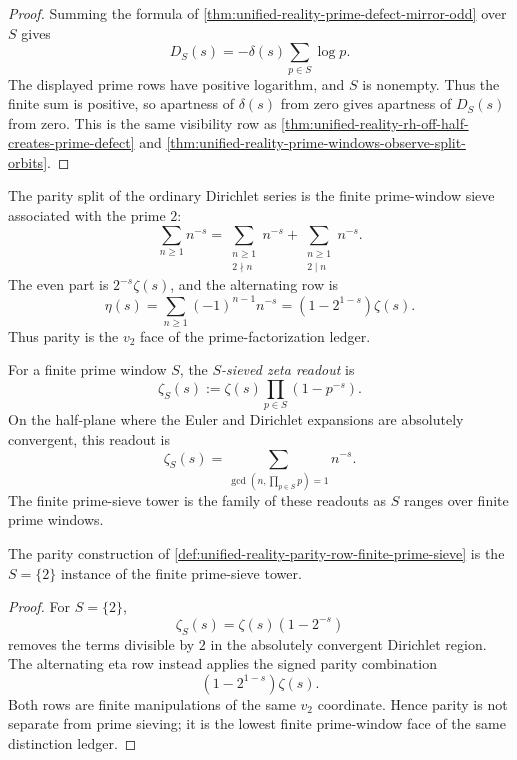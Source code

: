 \begin{proof}
Summing the formula of
\autoref{thm:unified-reality-prime-defect-mirror-odd} over $S$ gives
$$
D_S(s)
=
-\delta(s)\sum_{p\in S}\log p.
$$
The displayed prime rows have positive logarithm, and $S$ is nonempty.
Thus the finite sum is positive, so apartness of $\delta(s)$ from zero
gives apartness of $D_S(s)$ from zero.  This is the same visibility row
as \autoref{thm:unified-reality-rh-off-half-creates-prime-defect} and
\autoref{thm:unified-reality-prime-windows-observe-split-orbits}.
\end{proof}

\begin{definition}
\label{def:unified-reality-parity-row-finite-prime-sieve}
The parity split of the ordinary Dirichlet series is the finite
prime-window sieve associated with the prime $2$:
$$
\sum_{n\ge 1} n^{-s}
=
\sum_{\substack{n\ge 1\\2\nmid n}} n^{-s}
+
\sum_{\substack{n\ge 1\\2\mid n}} n^{-s}.
$$
The even part is $2^{-s}\zeta(s)$, and the alternating row is
$$
\eta(s)
=
\sum_{n\ge 1}(-1)^{n-1}n^{-s}
=
(1-2^{1-s})\zeta(s).
$$
Thus parity is the $v_2$ face of the prime-factorization ledger.
\end{definition}

\begin{definition}
\label{def:unified-reality-finite-prime-sieve-tower}
For a finite prime window $S$, the \emph{$S$-sieved zeta readout} is
$$
\zeta_S(s)
:=
\zeta(s)\prod_{p\in S}(1-p^{-s}).
$$
On the half-plane where the Euler and Dirichlet expansions are absolutely
convergent, this readout is
$$
\zeta_S(s)
=
\sum_{\gcd(n,\prod_{p\in S}p)=1}n^{-s}.
$$
The finite prime-sieve tower is the family of these readouts as $S$ ranges
over finite prime windows.
\end{definition}

\begin{theorem}
\label{thm:unified-reality-parity-first-finite-sieve-shadow}
The parity construction of
\autoref{def:unified-reality-parity-row-finite-prime-sieve} is the
$S=\{2\}$ instance of the finite prime-sieve tower.
\end{theorem}

\begin{proof}
For $S=\{2\}$,
$$
\zeta_S(s)=\zeta(s)(1-2^{-s})
$$
removes the terms divisible by $2$ in the absolutely convergent
Dirichlet region.  The alternating eta row instead applies the signed
parity combination
$$
(1-2^{1-s})\zeta(s).
$$
Both rows are finite manipulations of the same $v_2$ coordinate.  Hence
parity is not separate from prime sieving; it is the lowest finite
prime-window face of the same distinction ledger.
\end{proof}


